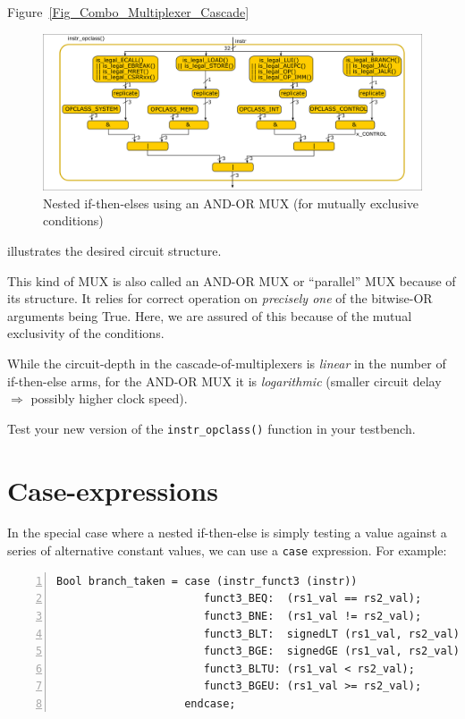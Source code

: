   Figure~\ref{Fig_Combo_Multiplexer_Cascade}
  \begin{figure}[htbp]
    \centerline{\includegraphics[width=6in,angle=0]{Figures/Fig_Combo_Multiplexer_Parallel}}
    \caption{\label{Fig_Combo_Multiplexer_Parallel}
             Nested if-then-elses using an AND-OR MUX (for mutually exclusive conditions)}
  \end{figure}
  illustrates the desired circuit structure.

  This kind of MUX is also called an AND-OR MUX or ``parallel'' MUX
  because of its structure.  It relies for correct operation on
  \emph{precisely one} of the bitwise-OR arguments being True.  Here,
  we are assured of this because of the mutual exclusivity of the
  conditions.

  While the circuit-depth in the cascade-of-multiplexers is
  \emph{linear} in the number of if-then-else arms, for the AND-OR MUX
  it is \emph{logarithmic} (smaller circuit delay
  $\Longrightarrow$ possibly higher clock speed).

\Exercise

Test your new version of the \verb|instr_opclass()| function in your
testbench.

\Endexercise


\section{Case-expressions}

\label{BSV_case_expressions}


In the special case where a nested if-then-else is simply testing a
value against a series of alternative constant values, we can use a
\verb|case| expression.  For example:

{\small
\begin{Verbatim}[frame=single, numbers=left, label=from src\_Common/Fn\_EX\_Control.bsv]
Bool branch_taken = case (instr_funct3 (instr))
                       funct3_BEQ:  (rs1_val == rs2_val);
                       funct3_BNE:  (rs1_val != rs2_val);
                       funct3_BLT:  signedLT (rs1_val, rs2_val);
                       funct3_BGE:  signedGE (rs1_val, rs2_val);
                       funct3_BLTU: (rs1_val < rs2_val);
                       funct3_BGEU: (rs1_val >= rs2_val);
                    endcase;
\end{Verbatim}
}

